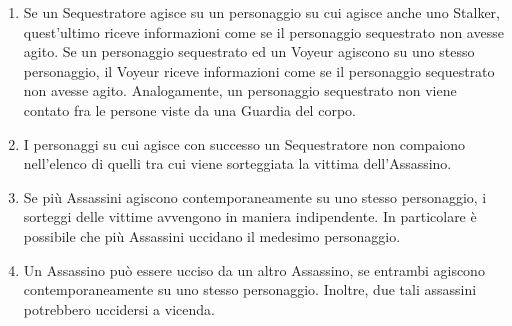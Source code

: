 \documentclass[a4paper,10pt]{article}
\begin{document}
\begin{enumerate}
	
	\item Se un Sequestratore agisce su un personaggio su cui agisce anche uno Stalker, quest'ultimo riceve informazioni come se il personaggio sequestrato non avesse agito. Se un personaggio sequestrato ed un Voyeur agiscono su uno stesso personaggio, il Voyeur riceve informazioni come se il personaggio sequestrato non avesse agito. Analogamente, un personaggio sequestrato non viene contato fra le persone viste da una Guardia del corpo.
	
	\item I personaggi su cui agisce con successo un Sequestratore non compaiono nell'elenco di quelli tra cui viene sorteggiata la vittima dell'Assassino.
	
	\item Se più Assassini agiscono contemporaneamente su uno stesso personaggio, i sorteggi delle vittime avvengono in maniera indipendente.
	In particolare è possibile che più Assassini uccidano il medesimo personaggio.
	
	\item Un Assassino può essere ucciso da un altro Assassino, se entrambi agiscono contemporaneamente su uno stesso personaggio. Inoltre, due tali assassini potrebbero uccidersi a vicenda.
	
 

\end{enumerate}
\end{document}
